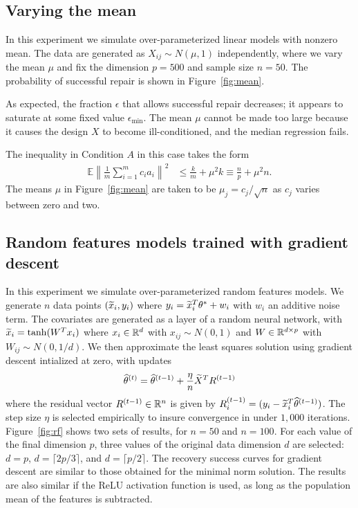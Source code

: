 \subsection{Varying the mean}

In this experiment we simulate over-parameterized linear models
with nonzero mean. The data are generated as $X_{ij} \sim N(\mu,1)$
independently, where we vary the mean $\mu$ and fix the dimension $p=500$ and sample size $n=50$.
The probability of successful repair is shown in Figure~\ref{fig:mean}.


As expected, the fraction $\epsilon$ that allows successful repair decreases; it appears to saturate at some fixed value $\epsilon_{\min}$. The mean $\mu$ cannot be made too large because it causes the design $X$ to become ill-conditioned, and the median regression fails.

The inequality in Condition $A$ in this case takes the form
\begin{align*}
  \mathbb{E}\left\|\frac{1}{m}\sum_{i=1}^m c_i a_i\right\|^2 &\leq \frac{k}{m} + \mu^2 k
   \equiv \frac{n}{p} + \mu^2 n.
\end{align*}
The means $\mu$ in Figure~\ref{fig:mean} are taken to be $\mu_j = c_j / \sqrt{n}$ as $c_j$ varies between zero and two.

\subsection{Random features models trained with gradient descent}

In this experiment we simulate over-parameterized random features models.
We generate $n$ data points $(\widetilde{x}_i, y_i)$ where
$y_i = \widetilde{x}_i^T \theta^* + w_i$ with $w_i$ an additive noise term. The covariates are generated
as a layer of a random neural network, with $\widetilde{x}_i = \tanh(W^Tx_i)$ where $x_i \in\mathbb{R}^d$ with $x_{ij} \sim N(0,1)$
and $W\in\mathbb{R}^{d\times p}$ with $W_{ij} \sim N(0, 1/d)$. We then approximate the least squares
solution using gradient descent intialized at zero, with updates
\begin{equation*}
  \hat\theta^{(t)} = \hat\theta^{(t-1)} + \frac{\eta}{n} \wt{X}^T R^{(t-1)}
\end{equation*}
where the residual vector $R^{(t-1)}\in\mathbb{R}^n$ is given by $R_i^{(t-1)} = (y_i - \widetilde{x}_i^ T\widehat\theta^{(t-1)})$.
The step size $\eta$ is selected empirically to insure convergence in under $1{,}000$ iterations.
Figure~\ref{fig:rf} shows two sets of results, for $n=50$ and $n=100$. For each value of the final dimension $p$,
three values of the original data dimension $d$ are selected: $d=p$, $d=\lceil 2p/3\rceil$,
and $d=\lceil p/2\rceil$. The recovery success curves for gradient descent are similar to those obtained for the minimal norm solution. The results are also similar if the ReLU activation function is used, as long as the population mean of the features is subtracted.

